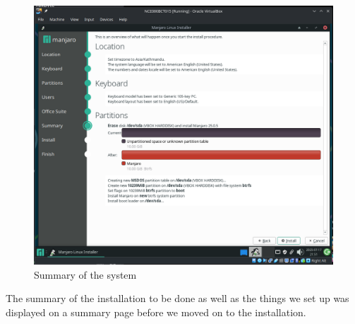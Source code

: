 \documentclass[a4paper,12pt]{report}
\begin{document}
\begin{figure}[h]
    \centering
    \includegraphics[width=1\linewidth]{install_summary.png}
    \caption{Summary of the system}
    \label{fig15}
\end{figure}
The summary of the installation to be done as well as the things we set up was displayed on a summary page before we moved on to the installation.
\newpage
\end{document}
